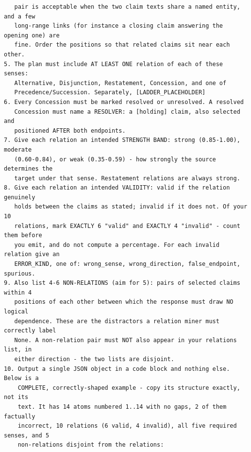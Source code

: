 \documentclass[11pt]{article}
\begin{document}
\begin{small}
\begin{verbatim}
   pair is acceptable when the two claim texts share a named entity, and a few
   long-range links (for instance a closing claim answering the opening one) are
   fine. Order the positions so that related claims sit near each other.
5. The plan must include AT LEAST ONE relation of each of these senses:
   Alternative, Disjunction, Restatement, Concession, and one of
   Precedence/Succession. Separately, [LADDER_PLACEHOLDER]
6. Every Concession must be marked resolved or unresolved. A resolved
   Concession must name a RESOLVER: a [holding] claim, also selected and
   positioned AFTER both endpoints.
7. Give each relation an intended STRENGTH BAND: strong (0.85-1.00), moderate
   (0.60-0.84), or weak (0.35-0.59) - how strongly the source determines the
   target under that sense. Restatement relations are always strong.
8. Give each relation an intended VALIDITY: valid if the relation genuinely
   holds between the claims as stated; invalid if it does not. Of your 10
   relations, mark EXACTLY 6 "valid" and EXACTLY 4 "invalid" - count them before
   you emit, and do not compute a percentage. For each invalid relation give an
   ERROR_KIND, one of: wrong_sense, wrong_direction, false_endpoint, spurious.
9. Also list 4-6 NON-RELATIONS (aim for 5): pairs of selected claims within 4
   positions of each other between which the response must draw NO logical
   dependence. These are the distractors a relation miner must correctly label
   None. A non-relation pair must NOT also appear in your relations list, in
   either direction - the two lists are disjoint.
10. Output a single JSON object in a code block and nothing else. Below is a
    COMPLETE, correctly-shaped example - copy its structure exactly, not its
    text. It has 14 atoms numbered 1..14 with no gaps, 2 of them factually
    incorrect, 10 relations (6 valid, 4 invalid), all five required senses, and 5
    non-relations disjoint from the relations:


\end{verbatim}
\end{small}
\end{document}

